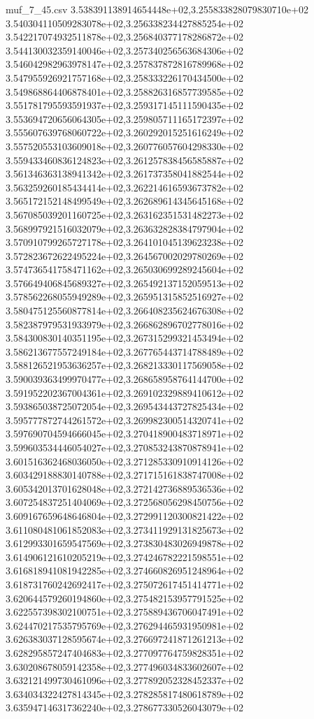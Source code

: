 \begin{filecontents*}{muf_7_45.csv}
3.538391138914654448e+02,3.255833828079830710e+02
3.540304110509283078e+02,3.256338234427885254e+02
3.542217074932511878e+02,3.256840377178286872e+02
3.544130032359140046e+02,3.257340256563684306e+02
3.546042982963978147e+02,3.257837872816789968e+02
3.547955926921757168e+02,3.258333226170434500e+02
3.549868864406878401e+02,3.258826316857739585e+02
3.551781795593591937e+02,3.259317145111590435e+02
3.553694720656064305e+02,3.259805711165172397e+02
3.555607639768060722e+02,3.260292015251616249e+02
3.557520553103609018e+02,3.260776057604298330e+02
3.559433460836124823e+02,3.261257838456585887e+02
3.561346363138941342e+02,3.261737358041882544e+02
3.563259260185434414e+02,3.262214616593673782e+02
3.565172152148499549e+02,3.262689614345645168e+02
3.567085039201160725e+02,3.263162351531482273e+02
3.568997921516032079e+02,3.263632828384797904e+02
3.570910799265727178e+02,3.264101045139623238e+02
3.572823672622495224e+02,3.264567002029780269e+02
3.574736541758471162e+02,3.265030699289245604e+02
3.576649406845689327e+02,3.265492137152059513e+02
3.578562268055949289e+02,3.265951315852516927e+02
3.580475125560877814e+02,3.266408235624676308e+02
3.582387979531933979e+02,3.266862896702778016e+02
3.584300830140351195e+02,3.267315299321453494e+02
3.586213677557249184e+02,3.267765443714788489e+02
3.588126521953636257e+02,3.268213330117569058e+02
3.590039363499970477e+02,3.268658958764144700e+02
3.591952202367004361e+02,3.269102329889410612e+02
3.593865038725072054e+02,3.269543443727825434e+02
3.595777872744261572e+02,3.269982300514320741e+02
3.597690704594666045e+02,3.270418900483718971e+02
3.599603534446054027e+02,3.270853243870878941e+02
3.601516362468036050e+02,3.271285330910914126e+02
3.603429188830140788e+02,3.271715161838747008e+02
3.605342013701628048e+02,3.272142736889536536e+02
3.607254837251404069e+02,3.272568056298450756e+02
3.609167659648646804e+02,3.272991120300821422e+02
3.611080481061852083e+02,3.273411929131825673e+02
3.612993301659547569e+02,3.273830483026949878e+02
3.614906121610205219e+02,3.274246782221598551e+02
3.616818941081942285e+02,3.274660826951248964e+02
3.618731760242692417e+02,3.275072617451414771e+02
3.620644579260194860e+02,3.275482153957791525e+02
3.622557398302100751e+02,3.275889436706047491e+02
3.624470217535795769e+02,3.276294465931950981e+02
3.626383037128595674e+02,3.276697241871261213e+02
3.628295857247404683e+02,3.277097764759828351e+02
3.630208678059142358e+02,3.277496034833602607e+02
3.632121499730461096e+02,3.277892052328452337e+02
3.634034322427814345e+02,3.278285817480618789e+02
3.635947146317362240e+02,3.278677330526043079e+02

\end{filecontents*}
